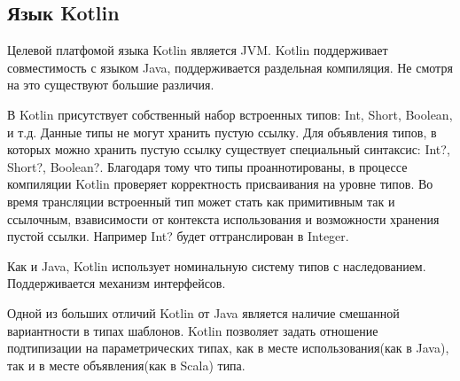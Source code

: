 \subsection{Язык Kotlin}

Целевой платфомой языка Kotlin является JVM. Kotlin поддерживает совместимость с языком Java\cite{kotlin:compatibility}, поддерживается раздельная компиляция. Не смотря на это существуют большие различия.

В Kotlin присутствует собственный набор встроенных типов: Int, Short, Boolean, и т.д. Данные типы не могут хранить пустую ссылку. Для объявления типов, в которых можно хранить пустую ссылку существует специальный синтаксис: Int?, Short?, Boolean?. Благодаря тому что типы проаннотированы, в процессе компиляции Kotlin проверяет корректность присваивания на уровне типов. Во время трансляции встроенный тип может стать как примитивным так и ссылочным, взависимости от контекста использования и возможности хранения пустой ссылки. Например Int? будет оттранслирован в Integer.

Как и Java, Kotlin использует номинальную систему типов с наследованием. Поддерживается механизм интерфейсов.

Одной из больших отличий Kotlin от Java является наличие смешанной вариантности в типах шаблонов. Kotlin позволяет задать отношение подтипизации на параметрических типах, как в месте использования(как в Java), так и в месте объявления(как в Scala) типа.

